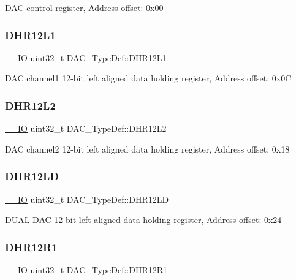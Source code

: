 D\+AC control register, Address offset\+: 0x00 \mbox{\label{struct_d_a_c___type_def_a5eb63912e39085e3e13d64bdb0cf38bd}} 
\subsubsection{\texorpdfstring{DHR12L1}{DHR12L1}}
{\footnotesize\ttfamily \mbox{\hyperlink{core__sc300_8h_aec43007d9998a0a0e01faede4133d6be}{\+\_\+\+\_\+\+IO}} uint32\+\_\+t D\+A\+C\+\_\+\+Type\+Def\+::\+D\+H\+R12\+L1}

D\+AC channel1 12-\/bit left aligned data holding register, Address offset\+: 0x0C \mbox{\label{struct_d_a_c___type_def_a9f612b6b3e065e810e5a2fb254d6a40b}} 
\subsubsection{\texorpdfstring{DHR12L2}{DHR12L2}}
{\footnotesize\ttfamily \mbox{\hyperlink{core__sc300_8h_aec43007d9998a0a0e01faede4133d6be}{\+\_\+\+\_\+\+IO}} uint32\+\_\+t D\+A\+C\+\_\+\+Type\+Def\+::\+D\+H\+R12\+L2}

D\+AC channel2 12-\/bit left aligned data holding register, Address offset\+: 0x18 \mbox{\label{struct_d_a_c___type_def_aea4d055e3697999b44cdcf2702d79d40}} 
\subsubsection{\texorpdfstring{DHR12LD}{DHR12LD}}
{\footnotesize\ttfamily \mbox{\hyperlink{core__sc300_8h_aec43007d9998a0a0e01faede4133d6be}{\+\_\+\+\_\+\+IO}} uint32\+\_\+t D\+A\+C\+\_\+\+Type\+Def\+::\+D\+H\+R12\+LD}

D\+U\+AL D\+AC 12-\/bit left aligned data holding register, Address offset\+: 0x24 \mbox{\label{struct_d_a_c___type_def_afbfd2855cdb81939b4efc58e08aaf3e5}} 
\subsubsection{\texorpdfstring{DHR12R1}{DHR12R1}}
{\footnotesize\ttfamily \mbox{\hyperlink{core__sc300_8h_aec43007d9998a0a0e01faede4133d6be}{\+\_\+\+\_\+\+IO}} uint32\+\_\+t D\+A\+C\+\_\+\+Type\+Def\+::\+D\+H\+R12\+R1}

